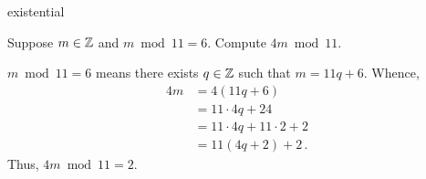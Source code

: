 existential\guard




\begin{exmp}
\label{exmp:modularArithmetic}
  Suppose $m\in\mathbb{Z}$ and $m\bmod 11=6$.
  Compute $4m\bmod 11$.

  $m\bmod 11=6$ means there exists $q\in\mathbb{Z}$ such that $m=11q+6$.
  Whence,
  \begin{align*}
    4m  &= 4(11q+6) \\
        &= 11\cdot4q + 24 \\
        &= 11\cdot4q + 11\cdot 2 + 2 \\
        &= 11(4q+2)+2\,.
  \end{align*}
  Thus, $4m\bmod 11=2$.
\end{exmp}
